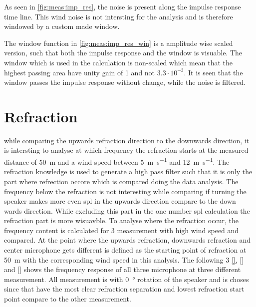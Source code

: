 

As seen in \autoref{fig:meas:imp_res}, the noise is present along the impulse response time line. This wind noise is not intersting for the analysis and is therefore windowed by a custom made window.   



The window function in \autoref{fig:meas:imp_res_win} is a amplitude wise scaled version, such that both the impulse response and the window is visuable. The window which is used in the calculation is non-scaled which mean that the highest passing area have unity gain of 1 and not $3.3 \cdot 10^{-3}$. It is seen that the window passes the impulse response without change, while the noise is filtered.



\section{Refraction}
while comparing the upwards refraction direction to the downwards direction, it is intersting to analyse at which frequency the refraction starts at the measured distance of \SI{50}{\meter} and a wind speed between \SI{5}{\meter\per\second} and \SI{12}{\meter\per\second}. The refraction knowledge is used to generate a high pass filter such that it is only the part where refrection occore which is compared doing the data analysis. The frequency below the refraction is not interesting while comparing if turning the speaker makes more even \gls{spl} in the upwards direction compare to the down wards direction. While excluding this part in the one number \gls{spl} calculation the refraction part is more wisuavble. To analyse where the refraction occur, the frequency content is calculated for 3 measurement with high wind speed and compared. At the point where the upwards refraction, downwards refraction and center microphone gets different is defined as the starting point of refraction at \SI{50}{\meter} with the corresponding wind speed in this analysis. The following 3 \autoref{}, \autoref{} and \autoref{} shows the frequency response of all three microphone at three different measurement. All measurement is with \SI{0}{\degree} rotation of the speaker and is choses since that have the most clear refraction separation and lowest refraction start point compare to the other measurement.


